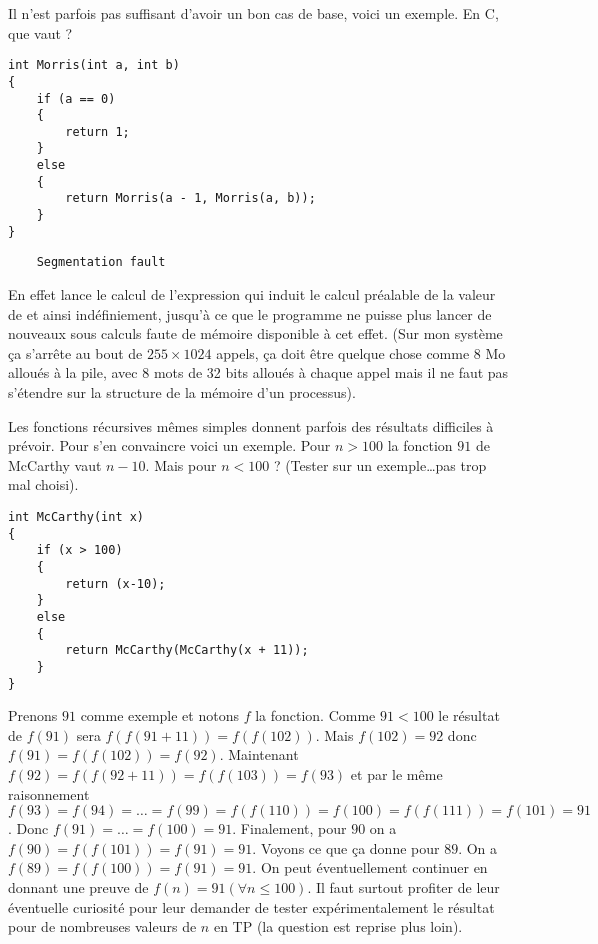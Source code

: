 \begin{newenu}
\item Il n'est parfois pas suffisant d'avoir un bon cas de base, voici un exemple. En C, que vaut  ?
\begin{verbatim}
int Morris(int a, int b)
{
    if (a == 0)
    {
        return 1;
    }
    else 
    {
        return Morris(a - 1, Morris(a, b));
    }
}
\end{verbatim}

  \begin{correction}
\begin{verbatim}
    Segmentation fault
\end{verbatim}
En effet  lance le calcul de l'expression  qui induit le calcul préalable de la valeur de   et ainsi indéfiniement, jusqu'à ce que le programme ne puisse plus lancer de nouveaux sous calculs faute de mémoire disponible à cet effet. (Sur mon système ça s'arrête au bout de $255\times 1024$ appels, ça doit être quelque chose comme 8 Mo alloués à la pile, avec 8 mots de 32 bits alloués à chaque appel mais il ne faut pas s'étendre sur la structure de la mémoire d'un processus).
\end{correction}

\item Les fonctions récursives mêmes simples donnent parfois des résultats difficiles à prévoir. Pour s'en convaincre voici un exemple. Pour $n > 100$ la fonction $91$ de McCarthy vaut $n - 10$. Mais pour $n < 100$ ? (Tester sur un exemple\ldots pas trop mal choisi).

\begin{verbatim}
int McCarthy(int x) 
{
    if (x > 100)
    {
        return (x-10);
    }
    else
    {
        return McCarthy(McCarthy(x + 11));
    }
}
\end{verbatim}

\begin{correction}
Prenons $91$ comme exemple et notons $f$ la fonction. Comme $91 < 100$ le résultat de $f(91)$ sera $f(f(91 + 11)) = f(f(102))$. Mais $f(102) = 92$ donc $f(91) = f(f(102)) = f(92)$. Maintenant $f(92) = f(f(92+11))=f(f(103))= f(93)$ et par le même raisonnement $f(93) = f(94) = \ldots = f(99) = f(f(110)) = f(100) = f(f(111)) = f(101) = 91$. Donc $f(91) = \ldots = f(100) = 91$. Finalement, pour $90$ on a $f(90) = f(f(101)) = f(91) = 91$.   Voyons ce que ça donne pour $89$. On a $f(89) = f(f(100)) = f(91) = 91$. On peut éventuellement continuer en donnant une preuve de $f(n) = 91 (\forall n \leq 100)$. Il faut surtout profiter de leur éventuelle curiosité pour leur demander de tester expérimentalement le résultat pour de nombreuses valeurs de $n$ en TP (la question est reprise plus loin).


\end{correction}
\end{newenu}
